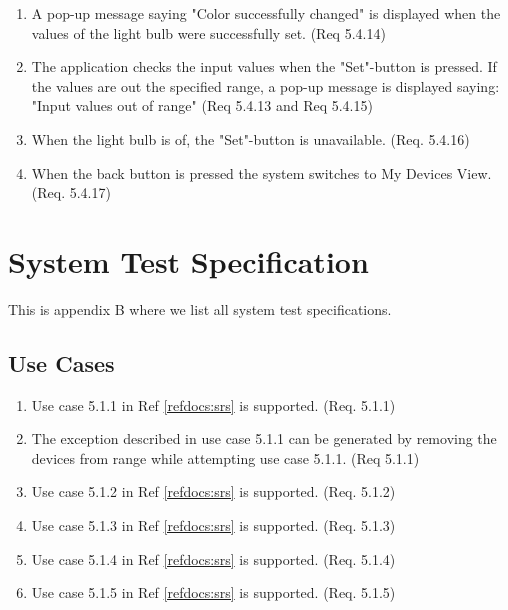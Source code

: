 \documentclass[a4paper]{article}
\newlength{\testlabellength}
\newenvironment{testlist}{\begin{enumerate}[label=\bfseries Test \thesubsection.\arabic* , labelindent=0pt, labelwidth=\testlabellength , leftmargin=2cm]}{\end{enumerate}}
\begin{document}
\begin{appendices}
\begin{testlist}
    \item A pop-up message saying "Color successfully changed" is displayed when the values of the light bulb were successfully set. (Req 5.4.14)
    
    \item The application checks the input values when the "Set"-button is pressed. If the values are out the specified range, a pop-up message is displayed saying: "Input values out of range" (Req 5.4.13 and Req 5.4.15)
    
    \item When the light bulb is of, the "Set"-button is unavailable. (Req. 5.4.16)
    
    \item When the back button is pressed the system switches to My Devices View. (Req. 5.4.17)

\end{testlist}	

\newpage

\section{System Test Specification} \label{appendix:section:systemtest}
This is appendix B where we list all system test specifications.

\subsection{Use Cases}
\begin{testlist}
	\item Use case 5.1.1 in Ref \ref{refdocs:srs} is supported. (Req. 5.1.1)
	\item The exception described in use case 5.1.1 can be generated by removing the devices from range while attempting use case 5.1.1. (Req 5.1.1)
	
	\item Use case 5.1.2 in Ref \ref{refdocs:srs} is supported. (Req. 5.1.2)
	
	\item Use case 5.1.3 in Ref \ref{refdocs:srs} is supported. (Req. 5.1.3)
	
	\item Use case 5.1.4 in Ref \ref{refdocs:srs}  is supported. (Req. 5.1.4)
	
	\item Use case 5.1.5 in Ref \ref{refdocs:srs} is supported. (Req. 5.1.5)
	

\end{testlist}
\end{appendices}
\end{document}
